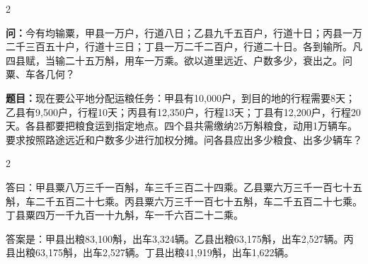\documentclass[11pt,a4paper]{article}
\begin{document}
\begin{paracol}{2}

\begin{problembox}
\textbf{问：}今有均输粟，甲县一万户，行道八日；乙县九千五百户，行道十日；丙县一万二千三百五十户，行道十三日；丁县一万二千二百户，行道二十日。各到输所。凡四县赋，当输二十五万斛，用车一万乘。欲以道里远近、户数多少，衰出之。问粟、车各几何？
\end{problembox}

\switchcolumn

\begin{problembox}
\textbf{题目：}现在要公平地分配运粮任务：甲县有10,000户，到目的地的行程需要8天；乙县有9,500户，行程10天；丙县有12,350户，行程13天；丁县有12,200户，行程20天。各县都要把粮食运到指定地点。四个县共需缴纳25万斛粮食，动用1万辆车。要求按照路途远近和户数多少进行加权分摊。问各县应出多少粮食、出多少辆车？
\end{problembox}

\end{paracol}

\vspace{0.2cm}

\begin{paracol}{2}

\begin{answerbox}[\CJKfamily{rm}答 · 原文]
答曰：甲县粟八万三千一百斛，车三千三百二十四乘。乙县粟六万三千一百七十五斛，车二千五百二十七乘。丙县粟六万三千一百七十五斛，车二千五百二十七乘。丁县粟四万一千九百一十九斛，车一千六百二十二乘。
\end{answerbox}

\switchcolumn

\begin{answerbox}[白话文：答案]
答案是：甲县出粮83,100斛，出车3,324辆。乙县出粮63,175斛，出车2,527辆。丙县出粮63,175斛，出车2,527辆。丁县出粮41,919斛，出车1,622辆。
\end{answerbox}

\end{paracol}

\vspace{0.2cm}
\end{document}
